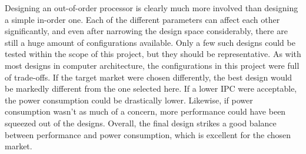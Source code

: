 \documentclass[english]{article}
\begin{document}
Designing an out-of-order processor is clearly much more involved than designing a simple in-order one. Each of the different parameters can affect each other significantly, and even after narrowing the design space considerably, there are still a huge amount of configurations available. Only a few such designs could be tested within the scope of this project, but they should be representative. As with most designs in computer architecture, the configurations in this project were full of trade-offs. If the target market were chosen differently, the best design would be markedly different from the one selected here. If a lower IPC were acceptable, the power consumption could be drastically lower. Likewise, if power consumption wasn't as much of a concern, more performance could have been squeezed out of the designs. Overall, the final design strikes a good balance between performance and power consumption, which is excellent for the chosen market.
\end{document}
